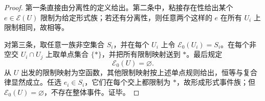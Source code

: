 \begin{proof}
第一条直接由分离性的定义给出。第二条中，粘接存在性给出某个 \(e\in\mathscr E(U)\) 限制为给定形式族；若还有分离性，则任意两个这样的 \(e\) 在所有 \(U_i\) 上限制相同，故相等。

对第三条，取任意一族非空集合 \(S_i\)，并在每个 \(U_i\) 上令 \(\mathscr E_0(U_i)=S_i\)。在每个非空交 \(U_i\cap U_j\) 上取单点集合 \(\{\ast\}\)，并把所有限制映射送到 \(\ast\)。最后规定
\[
\mathscr E_0(U)=\varnothing.
\]
从 \(U\) 出发的限制映射为空函数，其他限制映射按上述单点规则给出，恒等与复合律显然成立。任选 \(e_i\in S_i\)，它们在每个交上都限制为 \(\ast\)，故形成形式事件族；但 \(\mathscr E_0(U)=\varnothing\)，不存在整体事件。证毕。
\end{proof}

